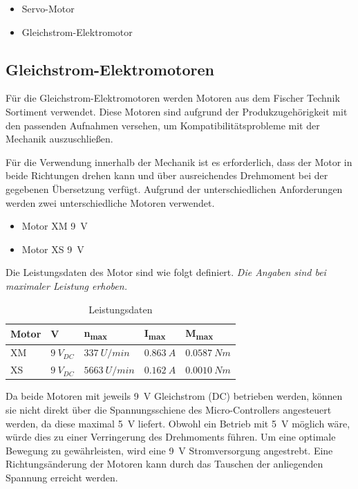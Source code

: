 \documentclass[conference,compsoc,final,a4paper]{IEEEtran}
\begin{document}
\begin{itemize}
	\item Servo-Motor
	\item Gleichstrom-Elektromotor
\end{itemize}

\subsection{Gleichstrom-Elektromotoren}
\noindent Für die Gleichstrom-Elektromotoren werden Motoren aus dem Fischer Technik Sortiment verwendet. 
Diese Motoren sind aufgrund der Produkzugehörigkeit mit den passenden Aufnahmen versehen, um Kompatibilitätsprobleme mit der Mechanik auszuschließen.


\noindent Für die Verwendung innerhalb der Mechanik ist es erforderlich, dass der Motor in beide Richtungen drehen kann und über ausreichendes Drehmoment bei der gegebenen Übersetzung verfügt.
Aufgrund der unterschiedlichen Anforderungen werden zwei unterschiedliche Motoren verwendet.
\begin{itemize}
\item Motor XM \qty{9}{V}
\item Motor XS \qty{9}{V}
\end{itemize}

\noindent Die Leistungsdaten des Motor sind wie folgt definiert. 
\newline \textit{Die Angaben sind bei maximaler Leistung erhoben.}

\begin{table}[h]
  \caption{Leistungsdaten}
  \label{Leistungsdaten}
  \centering
  \begin{tabular}{lllll}
    \toprule
    \textbf{Motor} & \textbf{V} & \textbf{n\textsubscript{max}} & \textbf{I\textsubscript{max}} & \textbf{M\textsubscript{max}} \\
    \midrule
      XM \autocite{motorenXM} & $\qty{9}{V}_{DC}$ & $\qty{337}{U/min}$ & $\qty{0.863}{A}$ & $\qty{0.0587}{Nm}$ \\ 
      XS \autocite{motorenXS} & $\qty{9}{V}_{DC}$ & $\qty{5663}{U/min}$ & $\qty{0.162}{A}$ & $\qty{0.0010}{Nm}$ \\
    \bottomrule
  \end{tabular}
\end{table}
  
\noindent Da beide Motoren mit jeweils \qty{9}{V} Gleichstrom (DC) betrieben werden, können sie nicht direkt über die Spannungsschiene des Micro-Controllers angesteuert werden, 
da diese maximal \qty{5}{V} liefert. Obwohl ein Betrieb mit \qty{5}{V} möglich wäre, würde dies zu einer Verringerung des Drehmoments führen. Um eine optimale Bewegung zu gewährleisten, 
wird eine \qty{9}{V} Stromversorgung angestrebt. Eine Richtungsänderung der Motoren kann durch das Tauschen der anliegenden Spannung erreicht werden.  
\end{document}
